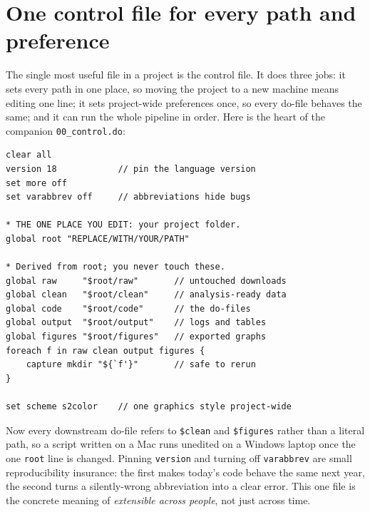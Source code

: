 \documentclass[
    a4paper,
    fontsize=10pt,
    twoside=true,
    numbers=noenddot,
]{kaobook}
\begin{document}
\section{One control file for every path and preference}\label{sec:control}
The single most useful file in a project is the control file. It does three jobs: it sets every path in one place, so moving the project to a new machine means editing one line; it sets project-wide preferences once, so every do-file behaves the same; and it can run the whole pipeline in order. Here is the heart of the companion \texttt{00\_control.do}:
{\footnotesize
\begin{verbatim}
clear all
version 18            // pin the language version
set more off
set varabbrev off     // abbreviations hide bugs

* THE ONE PLACE YOU EDIT: your project folder.
global root "REPLACE/WITH/YOUR/PATH"

* Derived from root; you never touch these.
global raw     "$root/raw"       // untouched downloads
global clean   "$root/clean"     // analysis-ready data
global code    "$root/code"      // the do-files
global output  "$root/output"    // logs and tables
global figures "$root/figures"   // exported graphs
foreach f in raw clean output figures {
    capture mkdir "${`f'}"       // safe to rerun
}

set scheme s2color    // one graphics style project-wide
\end{verbatim}
}
Now every downstream do-file refers to \texttt{\$clean} and \texttt{\$figures} rather than a literal path, so a script written on a Mac runs unedited on a Windows laptop once the one \texttt{root} line is changed. Pinning \texttt{version} and turning off \texttt{varabbrev} are small reproducibility insurance: the first makes today's code behave the same next year, the second turns a silently-wrong abbreviation into a clear error. This one file is the concrete meaning of \emph{extensible across people}, not just across time.
\end{document}
